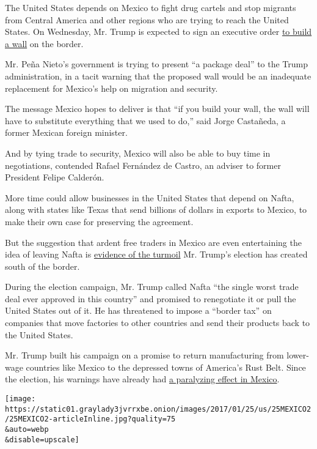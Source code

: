 The United States depends on Mexico to fight drug cartels and stop
migrants from Central America and other regions who are trying to reach
the United States. On Wednesday, Mr. Trump is expected to sign an
executive order
\href{https://www.nytimes3xbfgragh.onion/2017/01/24/us/politics/wall-border-trump.html?ribbon-ad-idx=3\&rref=homepage\&module=Ribbon\&version=origin\&region=Header\&action=click\&contentCollection=Home\%20Page\&pgtype=article}{to
build a wall} on the border.

Mr. Peña Nieto's government is trying to present ``a package deal'' to
the Trump administration, in a tacit warning that the proposed wall
would be an inadequate replacement for Mexico's help on migration and
security.

The message Mexico hopes to deliver is that ``if you build your wall,
the wall will have to substitute everything that we used to do,'' said
Jorge Castañeda, a former Mexican foreign minister.

And by tying trade to security, Mexico will also be able to buy time in
negotiations, contended Rafael Fernández de Castro, an adviser to former
President Felipe Calderón.

More time could allow businesses in the United States that depend on
Nafta, along with states like Texas that send billions of dollars in
exports to Mexico, to make their own case for preserving the agreement.

But the suggestion that ardent free traders in Mexico are even
entertaining the idea of leaving Nafta is
\href{https://www.nytimes3xbfgragh.onion/2016/11/10/world/americas/mexico-donald-trump-peso.html}{evidence
of the turmoil} Mr. Trump's election has created south of the border.

During the election campaign, Mr. Trump called Nafta ``the single worst
trade deal ever approved in this country'' and promised to renegotiate
it or pull the United States out of it. He has threatened to impose a
``border tax'' on companies that move factories to other countries and
send their products back to the United States.

Mr. Trump built his campaign on a promise to return manufacturing from
lower-wage countries like Mexico to the depressed towns of America's
Rust Belt. Since the election, his warnings have already had
\href{https://www.nytimes3xbfgragh.onion/2017/01/05/world/americas/mexico-pena-nieto-trump-turmoil-gasoline.html}{a
paralyzing effect in Mexico}.

\texttt{[image: https://static01.graylady3jvrrxbe.onion/images/2017/01/25/us/25MEXICO2/25MEXICO2-articleInline.jpg?quality=75\\\&auto=webp\\\&disable=upscale]}

